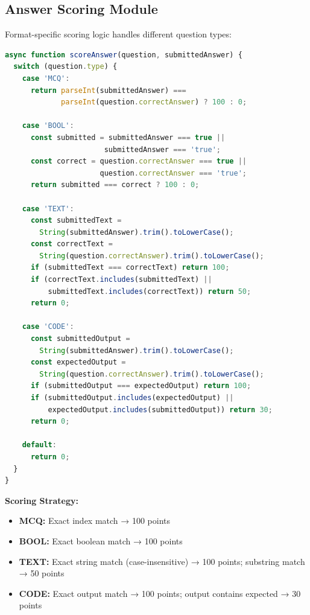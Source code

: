 \documentclass[12pt,a4paper]{report}
\begin{document}
\subsection{Answer Scoring Module}

Format-specific scoring logic handles different question types:

\begin{lstlisting}[language=JavaScript]
async function scoreAnswer(question, submittedAnswer) {
  switch (question.type) {
    case 'MCQ':
      return parseInt(submittedAnswer) === 
             parseInt(question.correctAnswer) ? 100 : 0;
    
    case 'BOOL':
      const submitted = submittedAnswer === true || 
                       submittedAnswer === 'true';
      const correct = question.correctAnswer === true || 
                      question.correctAnswer === 'true';
      return submitted === correct ? 100 : 0;
    
    case 'TEXT':
      const submittedText = 
        String(submittedAnswer).trim().toLowerCase();
      const correctText = 
        String(question.correctAnswer).trim().toLowerCase();
      if (submittedText === correctText) return 100;
      if (correctText.includes(submittedText) || 
          submittedText.includes(correctText)) return 50;
      return 0;
    
    case 'CODE':
      const submittedOutput = 
        String(submittedAnswer).trim().toLowerCase();
      const expectedOutput = 
        String(question.correctAnswer).trim().toLowerCase();
      if (submittedOutput === expectedOutput) return 100;
      if (submittedOutput.includes(expectedOutput) || 
          expectedOutput.includes(submittedOutput)) return 30;
      return 0;
    
    default:
      return 0;
  }
}
\end{lstlisting}

\textbf{Scoring Strategy:}
\begin{itemize}[left=0pt]
  \item \textbf{MCQ:} Exact index match → 100 points
  \item \textbf{BOOL:} Exact boolean match → 100 points
  \item \textbf{TEXT:} Exact string match (case-insensitive) → 100 points; substring match → 50 points
  \item \textbf{CODE:} Exact output match → 100 points; output contains expected → 30 points
\end{itemize}
\end{document}

